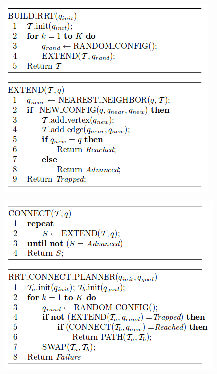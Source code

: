 \begin{figure}[ht!]
\centering
\begin{minipage}{.5\textwidth}
  \centering
  \includegraphics[width=1\linewidth]{Images/plan/RRT.png}
  \label{fig:rrt}
\end{minipage}%
\begin{minipage}{.5\textwidth}
  \centering
  \includegraphics[width=1\linewidth]{Images/plan/RRTstar.png}
  \label{fig:rrs}
\end{minipage}
\end{figure}

